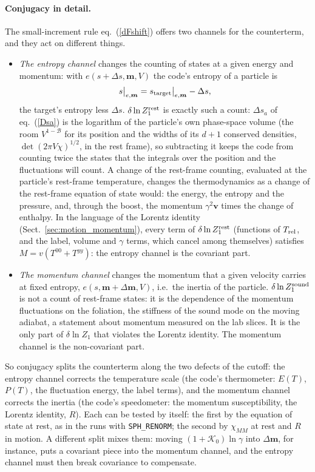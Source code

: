 \documentclass[11pt,aps,preprint,nofootinbib,superscriptaddress,tightenlines]{revtex4-2}
\newcommand{\klab}{\mathcal B}
\def\st{\begin{equation}}
\def\stp{\end{equation}}
\def\Eq#1{eq.~(\ref{#1})}
\def\Sect#1{Sect.~\ref{#1}}
\let\oldparagraph\paragraph
\renewcommand{\paragraph}{\par\bigskip\oldparagraph}
\begin{document}
\paragraph{Conjugacy in detail.}  The small-increment rule \Eq{dFshift} offers two channels for the counterterm, and they act on different things.
\begin{itemize}
\item \emph{The entropy channel} changes the counting of states at a given energy and momentum: with $e(s+\Delta s,\bm m,V)$ the code's entropy of a particle is
  \st
  s\big|_{e,\bm m}=s_{\rm target}\big|_{e,\bm m}-\Delta s ,
  \stp
  the target's entropy less $\Delta s$.  $\delta\ln Z_1^{\rm rest}$ is exactly such a count: $\Delta s_a$ of \Eq{Dsa} is the logarithm of the particle's own phase-space volume (the room
  $V^{1-\klab}$ for its position and the widths of its $d+1$ conserved densities, $\det(2\pi V\chi)^{1/2}$, in the rest frame), so subtracting it keeps the code from counting twice
  the states that the integrals over the position and the fluctuations will count.  A change of the rest-frame counting, evaluated at the particle's rest-frame
  temperature, changes the thermodynamics as a change of the rest-frame equation of state would: the energy, the entropy and the pressure, and, through the boost, the
  momentum $\gamma^2\bm v$ times the change of enthalpy.  In the language of the Lorentz identity (\Sect{sec:motion_momentum}), every term of $\delta\ln Z_1^{\rm rest}$ (functions of
  $T_{\rm rel}$, and the label, volume and $\gamma$ terms, which cancel among themselves) satisfies $M=v(T^{00}+T^{yy})$: the entropy channel is the covariant part.
\item \emph{The momentum channel} changes the momentum that a given velocity carries at fixed entropy, $e(s,\bm m+\Delta\bm m,V)$, i.e.\ the inertia of the particle.  $\delta\ln Z_1^{\rm sound}$ is
  not a count of rest-frame states: it is the dependence of the momentum fluctuations on the foliation, the stiffness of the sound mode on the moving adiabat, a statement
  about momentum measured on the lab slices.  It is the only part of $\delta\ln Z_1$ that violates the Lorentz identity.  The momentum channel is the non-covariant part.
\end{itemize}
So conjugacy splits the counterterm along the two defects of the cutoff: the entropy channel corrects the temperature scale (the code's thermometer: $E(T)$, $P(T)$, the
fluctuation energy, the label terms), and the momentum channel corrects the inertia (the code's speedometer: the momentum susceptibility, the Lorentz identity, $R$).  Each
can be tested by itself: the first by the equation of state at rest, as in the runs with \texttt{SPH\_RENORM}; the second by $\chi_{MM}$ at rest and $R$ in motion.  A
different split mixes them: moving $(1+\mathcal K_0)\ln\gamma$ into $\Delta\bm m$, for instance, puts a covariant piece into the momentum channel, and the entropy channel must
then break covariance to compensate.
\end{document}
